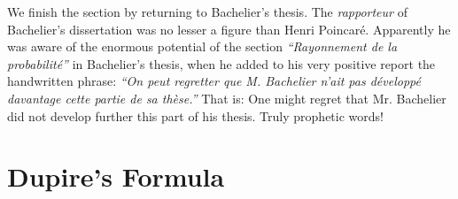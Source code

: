 \documentclass[11pt,a4paper]{article}%
\numberwithin{equation}{section}
\begin{document}

\medskip

We finish the section by returning to Bachelier's thesis. The \textit{rapporteur} of Bachelier's dissertation was no lesser a figure than Henri Poincar{\'e}. Apparently he was aware of the enormous potential of the section \textit{``Rayonnement de la probabilit{\'e}''} in Bachelier's thesis, when he added to his very positive report the handwritten phrase: \textit{``On peut regretter que M. Bachelier n'ait pas d{\'e}velopp{\'e} davantage cette partie de sa th{\`e}se.''} That is: One might regret that Mr. Bachelier did not develop further this part of his thesis. Truly prophetic words!




\section{Dupire's Formula} \label{Dupire}
\end{document}
